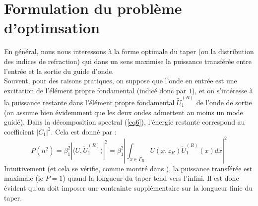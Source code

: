 \documentclass{article}
\begin{document}
\section{Formulation du problème d'optimsation}
En général, nous nous interessons à la forme optimale du taper (ou la distribution des indices de refraction) qui dans un sens maximise la puissance transférée entre l'entrée et la sortie du guide d'onde.\\
Souvent, pour des raisons pratiques, on suppose que l'onde en entrée est une excitation de l'élément propre fondamental (indicé donc par $1$), et on s'intéresse à la puissance restante dans l'élément propre fondamental $\tilde{U}^{(R)}_1$ de l'onde de sortie (on assume bien évidemment que les deux ondes admettent au moins un mode guidé). Dans la décomposition spectral (\ref{eq6}), l'énergie restante correspond au coefficient $|C_1|^2$. Cela est donné par :
\begin{equation}\label{eq11} P(n^2)=\beta_1^2|\langle U,\tilde{U}_1^{(R)}\rangle|^2=\beta_1^2\left|\int_{x\in\Gamma_R} U(x,z_R)\tilde{U}_1^{(R)}(x)dx\right|^2\end{equation}
Intuitivement (et cela se vérifie, comme montré dans \cite{Snyd}), la puissance transférée est maximale (ie $P=1$) quand la longueur du taper tend vers l'infini. Il est donc évident qu'on doit imposer une contrainte supplémentaire sur la longueur finie du taper.
\end{document}
